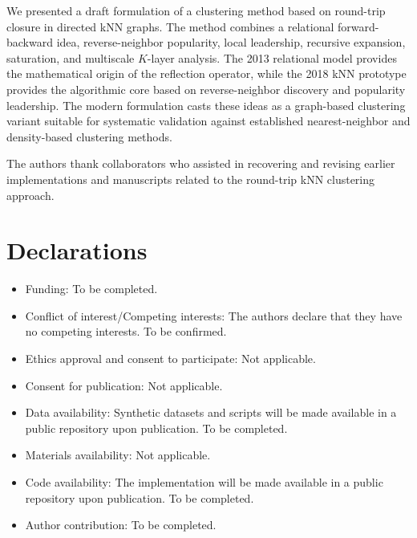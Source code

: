 \documentclass[pdflatex,sn-mathphys-num]{sn-jnl}
\theoremstyle{thmstyleone}
\theoremstyle{thmstyletwo}
\theoremstyle{thmstylethree}
\begin{document}
We presented a draft formulation of a clustering method based on round-trip closure in directed kNN graphs. The method combines a relational forward-backward idea, reverse-neighbor popularity, local leadership, recursive expansion, saturation, and multiscale $K$-layer analysis. The 2013 relational model provides the mathematical origin of the reflection operator, while the 2018 kNN prototype provides the algorithmic core based on reverse-neighbor discovery and popularity leadership. The modern formulation casts these ideas as a graph-based clustering variant suitable for systematic validation against established nearest-neighbor and density-based clustering methods.

\backmatter


The authors thank collaborators who assisted in recovering and revising earlier implementations and manuscripts related to the round-trip kNN clustering approach.

\section*{Declarations}

\begin{itemize}
\item Funding: To be completed.
\item Conflict of interest/Competing interests: The authors declare that they have no competing interests. To be confirmed.
\item Ethics approval and consent to participate: Not applicable.
\item Consent for publication: Not applicable.
\item Data availability: Synthetic datasets and scripts will be made available in a public repository upon publication. To be completed.
\item Materials availability: Not applicable.
\item Code availability: The implementation will be made available in a public repository upon publication. To be completed.
\item Author contribution: To be completed.
\end{itemize}


\end{document}
